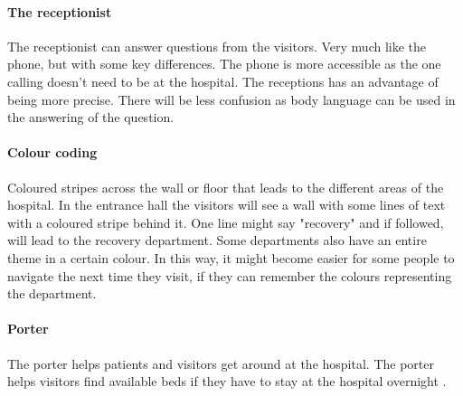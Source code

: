 \paragraph{The receptionist}

The receptionist can answer questions from the visitors. Very much like the phone, but with some key differences. The phone is more accessible as the one calling doesn't need to be at the hospital. The receptions has an advantage of being more precise. There will be less confusion as body language can be used in the answering of the question.

\paragraph{Colour coding}
Coloured stripes across the wall or floor that leads to the different areas of the hospital. In the entrance hall the visitors will see a wall with some lines of text with a coloured stripe behind it. One line might say "recovery" and if followed, will lead to the recovery department. Some departments also have an entire theme in a certain colour. In this way, it might become easier for some people to navigate the next time they visit, if they can remember the colours representing the department. 

\paragraph{Porter}
The porter helps patients and visitors get around at the hospital. The porter helps visitors find available beds if they have to stay at the hospital overnight \cite{ugd_port}. 

